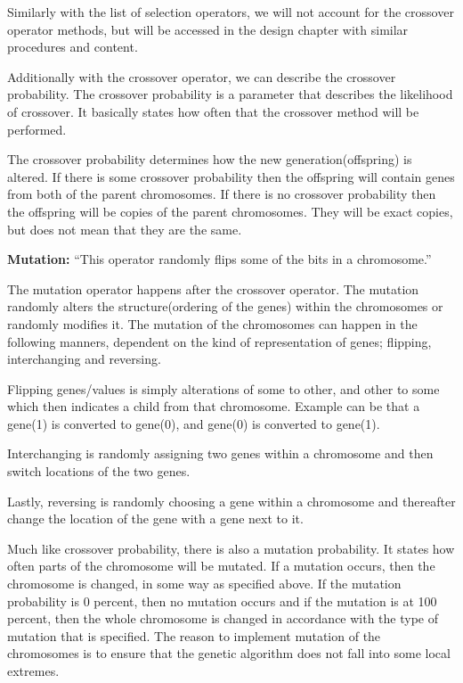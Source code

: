 Similarly with the list of selection operators, we will not account for the crossover operator methods, but will be accessed in the design chapter with similar procedures and content.

Additionally with the crossover operator, we can describe the crossover probability.
The crossover probability is a parameter that describes the likelihood of crossover. It basically states how often that the crossover method will be performed.\cite[pp. 56]{Sivanandam2008}

The crossover probability determines how the new generation(offspring) is altered. If there is some crossover probability then the offspring will contain genes from both of the parent chromosomes. If there is no crossover probability then the offspring will be copies of the parent chromosomes. They will be exact copies, but does not mean that they are the same.


\textbf{Mutation:} \enquote{This operator randomly flips some of the bits in a chromosome.} \cite[pp. 8]{Melanie1990}

The mutation operator happens after the crossover operator. The mutation randomly alters the structure(ordering of the genes) within the chromosomes or randomly modifies it.
The mutation of the chromosomes can happen in the following manners, dependent on the kind of representation of genes; flipping, interchanging and reversing.\cite[pp. 57]{Sivanandam2008}

Flipping genes/values is simply alterations of some to other, and other to some which then indicates a child from that chromosome. Example can be that a gene(1) is converted to gene(0), and gene(0) is converted to gene(1).

Interchanging is randomly assigning two genes within a chromosome and then switch locations of the two genes.

Lastly, reversing is randomly choosing a gene within a chromosome and thereafter change the location of the gene with a gene next to it.

Much like crossover probability, there is also a mutation probability. It states how often parts of the chromosome will be mutated. If a mutation occurs, then the chromosome is changed, in some way as specified above. If the mutation probability is 0 percent, then no mutation occurs and if the mutation is at 100 percent, then the whole chromosome is changed in accordance with the type of mutation that is specified. The reason to implement mutation of the chromosomes is to ensure that the genetic algorithm does not fall into some local extremes.\cite[pp. 57]{Sivanandam2008}

